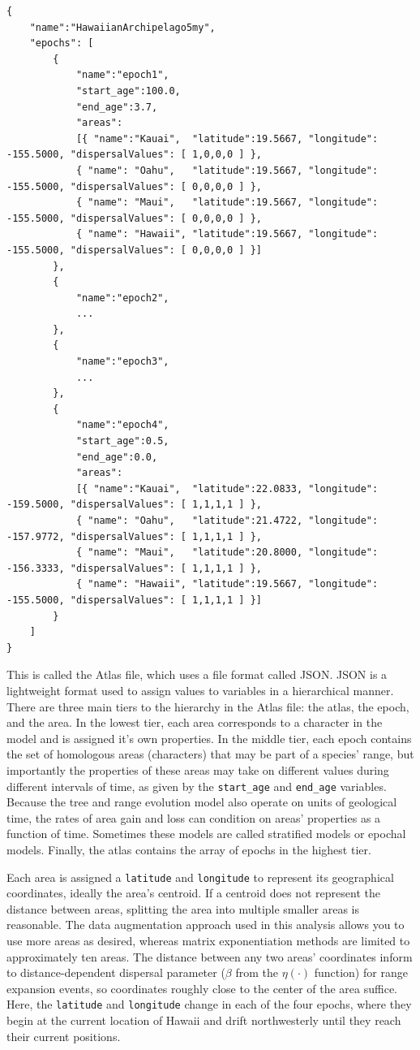 \documentclass[11pt]{article}
\begin{document}
\begin{framed}
\begin{lstlisting}[basicstyle=\tiny \listingsfont, columns=texcl]
{
	"name":"HawaiianArchipelago5my",
	"epochs": [
		{
			"name":"epoch1",
			"start_age":100.0,
			"end_age":3.7,
			"areas":
			[{ "name":"Kauai",  "latitude":19.5667, "longitude": -155.5000, "dispersalValues": [ 1,0,0,0 ] },
			{ "name": "Oahu",   "latitude":19.5667, "longitude": -155.5000, "dispersalValues": [ 0,0,0,0 ] },
			{ "name": "Maui",   "latitude":19.5667, "longitude": -155.5000, "dispersalValues": [ 0,0,0,0 ] },
			{ "name": "Hawaii", "latitude":19.5667, "longitude": -155.5000, "dispersalValues": [ 0,0,0,0 ] }]
		},
		{
			"name":"epoch2",
			...
		},
		{
			"name":"epoch3",
			...
		},
		{
			"name":"epoch4",
			"start_age":0.5,
			"end_age":0.0,
			"areas":
			[{ "name":"Kauai",  "latitude":22.0833, "longitude": -159.5000, "dispersalValues": [ 1,1,1,1 ] },
			{ "name": "Oahu",   "latitude":21.4722, "longitude": -157.9772, "dispersalValues": [ 1,1,1,1 ] },
			{ "name": "Maui",   "latitude":20.8000, "longitude": -156.3333, "dispersalValues": [ 1,1,1,1 ] },
			{ "name": "Hawaii", "latitude":19.5667, "longitude": -155.5000, "dispersalValues": [ 1,1,1,1 ] }]
		}
	]
}
\end{lstlisting}
\end{framed}

This is called the Atlas file, which uses a file format called JSON.
JSON is a lightweight format used to assign values to variables in a hierarchical manner.
There are three main tiers to the hierarchy in the Atlas file: the atlas, the epoch, and the area.
In the lowest tier, each area corresponds to a character in the model and is assigned it's own properties.
In the middle tier, each epoch contains the set of homologous areas (characters) that may be part of a species' range, but importantly the properties of these areas may take on different values during different intervals of time, as given by the {\tt start\_age} and {\tt end\_age} variables.
Because the tree and range evolution model also operate on units of geological time, the rates of area gain and loss can condition on areas' properties as a function of time.
Sometimes these models are called stratified models or epochal models.
Finally, the atlas contains the array of epochs in the highest tier.

Each area is assigned a {\tt latitude} and {\tt longitude} to represent its geographical coordinates, ideally the area's centroid.
If a centroid does not represent the distance between areas, splitting the area into multiple smaller areas is reasonable.
The data augmentation approach used in this analysis allows you to use more areas as desired, whereas matrix exponentiation methods are limited to approximately ten areas.
The distance between any two areas' coordinates inform to distance-dependent dispersal parameter ($\beta$ from the $\eta(\cdot)$ function) for range expansion events, so coordinates roughly close to the center of the area suffice.
Here, the {\tt latitude} and {\tt longitude} change in each of the four epochs, where they begin at the current location of Hawaii and drift northwesterly until they reach their current positions.
\end{document}
